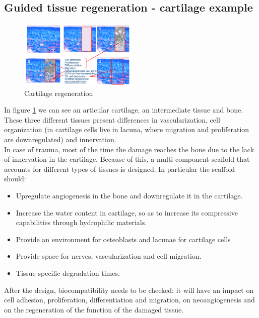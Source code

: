 	\subsection{Guided tissue regeneration - cartilage example}

		\begin{figure}[ht]
			\centering
			\includegraphics[width=0.5\textwidth]{cartilage.png}
			\caption{Cartilage regeneration}
			\label{fig:cartilage}
		\end{figure}

	In figure \ref{fig:cartilage} we can see an articular cartilage, an intermediate tissue and bone.
	These three different tissues present differences in vascularization, cell organization (in cartilage cells live in lacuna, where migration and proliferation are downregulated) and innervation.\\
	In case of trauma, most of the time the damage reaches the bone due to the lack of innervation in the cartilage.
	Because of this, a multi-component scaffold that accounts for different types of tissues is designed.
	In particular the scaffold should:

	\begin{multicols}{2}
		\begin{itemize}
			\item Upregulate angiogenesis in the bone and downregulate it in the cartilage.
			\item Increase the water content in cartilage, so as to increase its compressive capabilities through hydrophilic materials.
			\item Provide an environment for osteoblasts and lacunae for cartilage cells
			\item Provide space for nerves, vascularization and cell migration.
			\item Tissue specific degradation times.
		\end{itemize}
	\end{multicols}

	After the design, biocompatibility needs to be checked: it will have an impact on cell adhesion, proliferation, differentiation and migration, on neoangiogenesis and on the regeneration of the function of the damaged tissue.

